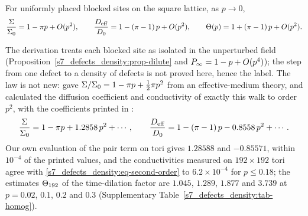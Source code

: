 \begin{heuristic}\label{s7_defects_density:res-dilute}
For uniformly placed blocked sites on the square lattice, as $p\to0$,
\begin{equation}\label{s7_defects_density:eq-dilute}
  \frac{\Sigma}{\Sigma_{0}}=1-\pi p+O(p^{2}),\qquad
  \frac{D_{\mathrm{eff}}}{D_{0}}=1-(\pi-1)\,p+O(p^{2}),\qquad
  \Theta(p)=1+(\pi-1)\,p+O(p^{2}).
\end{equation}
\end{heuristic}

The derivation treats each blocked site as isolated in the unperturbed field (Proposition~\ref{s7_defects_density:prop-dilute}
and $P_{\infty}=1-p+O(p^{4})$); the step from one defect to a density of defects is not proved here, hence the label. The
law is not new: \citet{WatsonLeath1974} gave $\Sigma/\Sigma_{0}=1-\pi p+\tfrac12\pi p^{2}$ from an effective-medium theory, and
\citet{Nieuwenhuizen1986} calculated the diffusion coefficient and conductivity of exactly this walk to order $p^{2}$, with
the coefficients printed in \citet{Ernst1987}:
\begin{equation}\label{s7_defects_density:eq-second-order}
  \frac{\Sigma}{\Sigma_{0}}=1-\pi p+1.2858\,p^{2}+\cdots,\qquad
  \frac{D_{\mathrm{eff}}}{D_{0}}=1-(\pi-1)\,p-0.8558\,p^{2}+\cdots .
\end{equation}
Our own evaluation of the pair term on tori gives $1.28588$ and $-0.85571$, within $10^{-4}$ of the printed values, and
the conductivities measured on $192\times192$ tori agree with \eqref{s7_defects_density:eq-second-order} to $6.2\times10^{-4}$ for
$p\le0.18$; the estimates $\Theta_{192}$ of the time-dilation factor are $1.045$, $1.289$, $1.877$ and $3.739$ at $p=0.02$, $0.1$,
$0.2$ and $0.3$ (Supplementary Table~\ref{s7_defects_density:tab-homog}).

